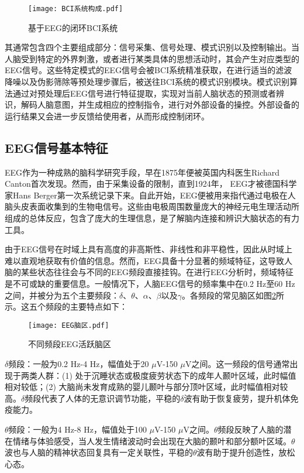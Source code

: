\begin{figure}[h]
	\centering
	\texttt{[image: BCI系统构成.pdf]}
	\caption{基于EEG的闭环BCI系统\cite{1-28}}
	\label{fig1-1}
\end{figure}

其通常包含四个主要组成部分：信号采集、信号处理、模式识别以及控制输出。当人脑受到特定的外界刺激，或者进行某类具体的思想活动时，其会产生对应类型的EEG信号。这些特定模式的EEG信号会被BCI系统精准获取，在进行适当的滤波降噪以及伪影筛除等预处理步骤后，被送往BCI系统的模式识别模块。模式识别算法通过对预处理后EEG信号进行特征提取，实现对当前人脑状态的预测或者辨识，解码人脑意图，并生成相应的控制指令，进行对外部设备的操控。外部设备的运行结果又会进一步反馈给使用者，从而形成控制闭环。

\subsection{EEG信号基本特征}
EEG作为一种成熟的脑科学研究手段，早在1875年便被英国内科医生Richard Canton首次发现。然而，由于采集设备的限制，直到1924年，
EEG才被德国科学家Hans Berger第一次系统记录下来\cite{1-20}。自此开始，EEG便被用来指代通过电极在人脑头皮表面收集到的生物电信号。这些由电极周围数量庞大的神经元电生理活动所组成的总体反应，包含了庞大的生理信息，是了解脑内连接和辨识大脑状态的有力工具。

由于EEG信号在时域上具有高度的非高斯性、非线性和非平稳性，因此从时域上难以直观地获取有价值的信息\cite{1-21,1-103}。然而，EEG具备十分显著的频域特征，这导致人脑的某些状态往往会与不同的EEG频段直接挂钩。在进行EEG分析时，频域特征是不可或缺的重要信息。一般情况下，人脑EEG信号的频率集中在0.2 Hz至60 Hz之间，并被分为五个主要频段：$\delta$、$\theta$、$\alpha$、$\beta$以及$\gamma$。各频段的常见脑区如图\ref{fig1-2}所示。这五个频段的主要特点如下：

\begin{figure}[!h]
	\centering
	\texttt{[image: EEG脑区.pdf]}
	\caption{不同频段EEG活跃脑区}
	\label{fig1-2}
\end{figure}

$\delta$频段：一般为0.2 Hz-4 Hz，幅值处于20 $\mu $V-150 $\mu $V之间。这一频段的信号通常出现于两类人群：(1) 处于沉睡状态或极度疲劳状态下的成年人颞叶区域，此时幅值相对较低；(2) 大脑尚未发育成熟的婴儿颞叶与部分顶叶区域，此时幅值相对较高。$\delta$频段代表了人体的无意识调节功能，平稳的$\delta$波有助于恢复疲劳，提升机体免疫能力。

$\theta$频段：一般为4 Hz-8 Hz，幅值处于100 $\mu $V-150 $\mu $V之间。$\theta$频段反映了人脑的潜在情绪与体验感受，当人发生情绪波动时会出现在大脑的颞叶和部分额叶区域。$\theta$波也与人脑的精神状态回复具有一定关联性，平稳的$\theta$波有助于提升创造性，放松心态。

